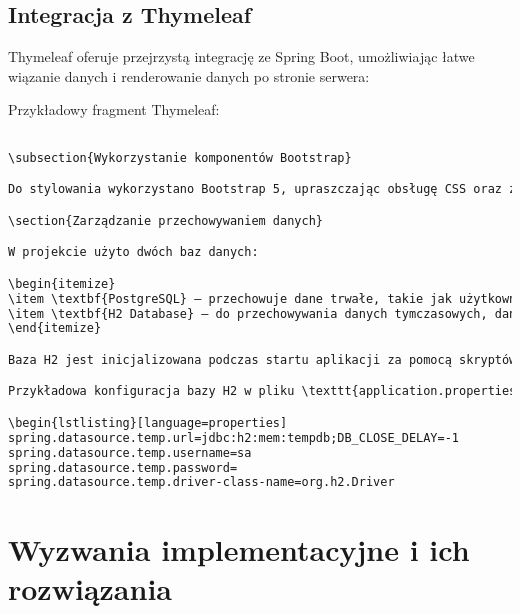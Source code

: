 \subsection{Integracja z Thymeleaf}

Thymeleaf oferuje przejrzystą integrację ze Spring Boot, umożliwiając łatwe wiązanie danych i renderowanie danych po stronie serwera:

Przykładowy fragment Thymeleaf:

\begin{lstlisting}[language=HTML]

\subsection{Wykorzystanie komponentów Bootstrap}

Do stylowania wykorzystano Bootstrap 5, upraszczając obsługę CSS oraz zapewniając spójny design na różnych urządzeniach.

\section{Zarządzanie przechowywaniem danych}

W projekcie użyto dwóch baz danych:

\begin{itemize}
\item \textbf{PostgreSQL} – przechowuje dane trwałe, takie jak użytkownicy, posty, komentarze, lekcje oraz zadania.
\item \textbf{H2 Database} – do przechowywania danych tymczasowych, danych sesji, statystyk aplikacji oraz celów testowych.
\end{itemize}

Baza H2 jest inicjalizowana podczas startu aplikacji za pomocą skryptów schematu oraz danych, co pozwala na szybkie testowanie bez wpływu na dane produkcyjne.

Przykładowa konfiguracja bazy H2 w pliku \texttt{application.properties}:

\begin{lstlisting}[language=properties]
spring.datasource.temp.url=jdbc:h2:mem:tempdb;DB_CLOSE_DELAY=-1
spring.datasource.temp.username=sa
spring.datasource.temp.password=
spring.datasource.temp.driver-class-name=org.h2.Driver
\end{lstlisting}

\section{Wyzwania implementacyjne i ich rozwiązania}

